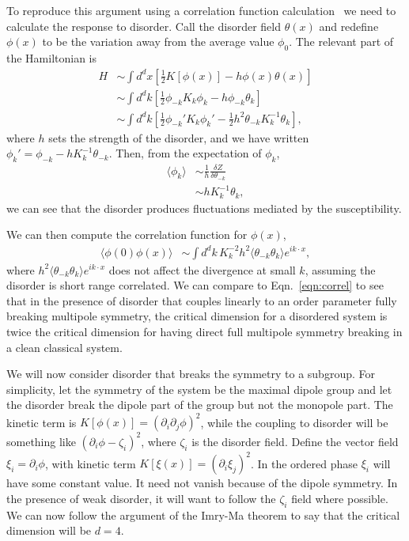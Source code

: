 \documentclass[twocolumn, longbibliography]{revtex4-2}
\newcommand{\nn}{\nonumber\\}
\newcommand{\half}{\frac{1}{2}}
\begin{document}
To reproduce this argument using a correlation function calculation~\cite{ImryMa} we need to calculate the response to disorder. Call the disorder field $\theta(x)$ and redefine $\phi(x)$ to be the variation away from the average value $\phi_0$. The relevant part of the Hamiltonian is 
\begin{align}
H &\sim \int d^dx \left[ \half K[ \phi(x)] - h \phi(x) \theta(x) \right] \nn
&\sim \int d^dk \left[ \half \phi_{-k} K_k \phi_k -h \phi_{-k} \theta_k \right] \nn
&\sim \int d^dk \left[ \half \phi_{-k}' K_k \phi_k' - \half h^2 \theta_{-k} K^{-1}_k \theta_k \right],
\end{align}
where $h$ sets the strength of the disorder, and we have written $\phi_k' = \phi_{-k} - h K^{-1}_k \theta_{-k}$. Then, from the expectation of $\phi_k$,
\begin{align}
\langle \phi_k \rangle &\sim \frac{1}{h} \frac{\delta Z}{\delta \theta_{-k} } \nn
&\sim h K_k^{-1} \theta_{k},
\end{align}
we can see that the disorder produces fluctuations mediated by the susceptibility.

We can then compute the correlation function for $\phi(x)$,
\begin{align}
\langle \phi(0) \phi(x) \rangle &\sim \int d^dk \, K_k^{-2}  h^2 \langle \theta_{-k} \theta_{k} \rangle e^{ik\cdot x},
\end{align}
where $h^2 \langle \theta_{-k} \theta_{k} \rangle e^{ik\cdot x}$ does not affect the divergence at small $k$, assuming the disorder is short range correlated. We can compare to Eqn.~\ref{eqn:correl} to see that in the presence of disorder that couples linearly to an order parameter fully breaking multipole symmetry, the critical dimension for a disordered system is twice the critical dimension for having direct full multipole symmetry breaking in a clean classical system.

We will now consider disorder that breaks the symmetry to a subgroup. For simplicity, let the symmetry of the system be the maximal dipole group and let the disorder break the dipole part of the group but not the monopole part. The kinetic term is $K[\phi(x)]= (\partial_i \partial_j \phi)^2$, while the coupling to disorder will be something like $(\partial_i\phi - \zeta_i)^2$, where $\zeta_i$ is the disorder field. 
Define the vector field $\xi_i = \partial_i\phi$, with kinetic term $K[\xi(x)]= (\partial_i \xi_j)^2$. In the ordered phase $\xi_i$ will have some constant value. It need not vanish because of the dipole symmetry. In the presence of weak disorder, it will want to follow the $\zeta_i$ field where possible. We can now follow the argument of the Imry-Ma theorem to say that the critical dimension will be $d=4$.
\end{document}
